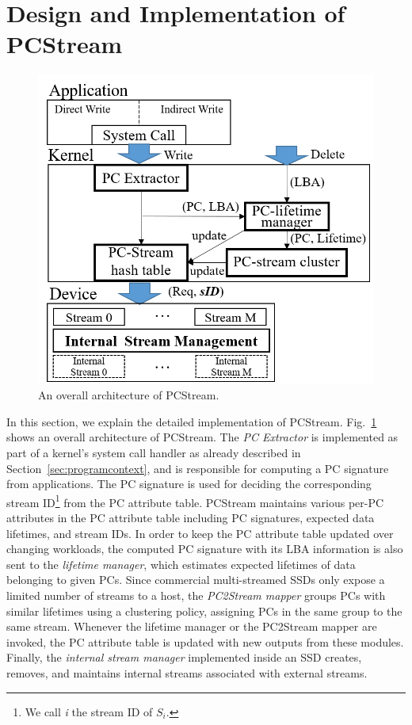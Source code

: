 \section{Design and Implementation of \textsf{PCStream}}

\begin{figure}[t]
	\centering
	\includegraphics[width=0.8\linewidth]{figure/overview}
	\caption{
		An overall architecture of \textsf{\small PCStream}. 
	}
	\label{fig:architecture}
\end{figure}


In this section, we explain the detailed implementation of \textsf{\small
PCStream}.  Fig.~\ref{fig:architecture} shows an overall architecture of
\textsf{\small PCStream}. The \textit{PC Extractor} is implemented as
part of a kernel's system call handler as already described in
Section~\ref{sec:programcontext}, and is responsible for computing a PC signature
from applications.  
{\color{blue}
The PC signature is used for deciding the corresponding stream ID\footnote{
We call {\it i} the stream ID of $S_i$.} from the PC attribute table.
PCStream maintains various per-PC attributes in the PC attribute table
including PC signatures, expected data lifetimes, and stream IDs.
In order to keep the PC attribute table updated over changing workloads,
the computed PC signature with its LBA information is also sent to the 
{\it lifetime manager}, which 
}
estimates expected lifetimes of data belonging to given PCs.
Since commercial multi-streamed SSDs only expose a limited number of streams to a host, 
the \textit{PC2Stream mapper} groups PCs with similar lifetimes using a clustering
policy, assigning PCs in the same group to the same stream.  
{\color{blue}
Whenever the lifetime manager or the PC2Stream mapper are invoked,
the PC attribute table is updated with new outputs from these modules.
}
Finally, the
\textit{internal stream manager} implemented inside an SSD creates, removes,
and maintains internal streams associated with external streams.

